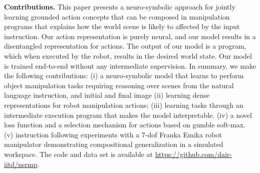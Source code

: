 %
\textbf{Contributions.} 
This paper presents a neuro-symbolic approach for jointly learning grounded action concepts that can be composed in manipulation programs that explains how the world scene is likely to affected by the input instruction. 
Our action representation is purely neural, and our model results in a disentangled representation for actions.  The output of our model is a program, which when executed by the robot, results in the desired world state. Our model is trained end-to-end without any intermediate supervision. 
In summary, we make the following contributions:  
(i) a neuro-symbolic model that learns to perform object manipulation tasks requiring reasoning over scenes from the natural language instruction, and initial and final image
(ii) learning dense representations for robot manipulation actions;
(iii) learning tasks through an intermediate execution program that makes the model interpretable.
(iv) a novel loss function and a selection mechanism for actions based on gumble soft-max.
(v) instruction following experiments with a 7-dof Franka Emika robot manipulator demonstrating compositional generalization in a simulated workspace. The code and data set is available at \url{https://github.com/dair-iitd/nsrmp}.  


